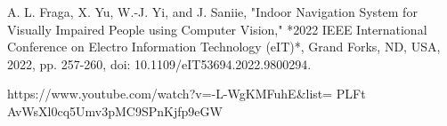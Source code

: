 \begin{thebibliography}{9}
	A. L. Fraga, X. Yu, W.-J. Yi, and J. Saniie, "Indoor Navigation System for Visually Impaired People using Computer Vision," *2022 IEEE International Conference on Electro Information Technology (eIT)*, Grand Forks, ND, USA, 2022, pp. 257-260, doi: 10.1109/eIT53694.2022.9800294.
	

	https://www.youtube.com/watch?v=-L-WgKMFuhE\&list=
	PLFt AvWsXl0cq5Umv3pMC9SPnKjfp9eGW
	
	
	
\end{thebibliography}